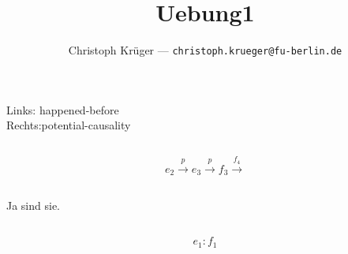 \documentclass{scrartcl}
\title{
	Uebung1
}
\author{
	Christoph Krüger --- \texttt{christoph.krueger@fu-berlin.de}
}
\begin{document}
\section{}
\subsection{}
Links: happened-before\\
Rechts:potential-causality

\subsection{}
\[e_2  \xrightarrow{p} e_3 \xrightarrow{p} f_3 \xrightarrow{f_4}\]

\subsection{}
Ja sind sie.

\subsection{}
\[e_1:f_1\]
\end{document}
